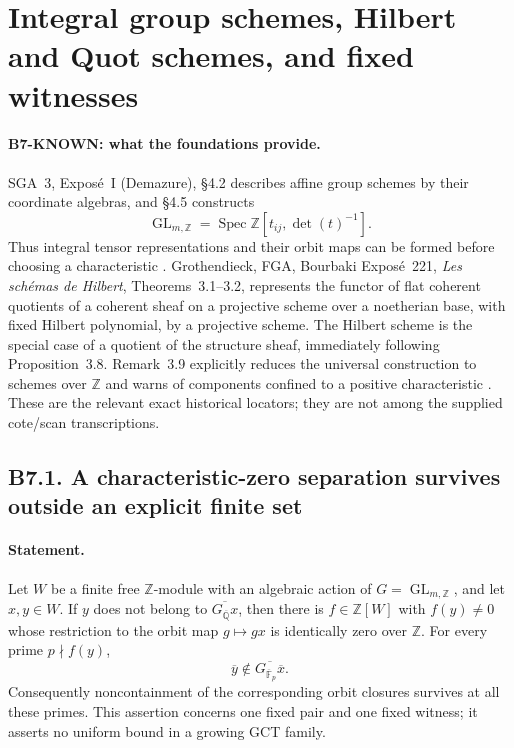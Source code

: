 \documentclass[11pt,a4paper]{article}
\begin{document}
\section{Integral group schemes, Hilbert and Quot schemes, and fixed witnesses}
\label{sec:bridge-integral}

\paragraph{B7-KNOWN: what the foundations provide.}
SGA~3, Expos\'e~I (Demazure), \S4.2 describes affine group schemes by
their coordinate algebras, and \S4.5 constructs
\[
 \operatorname{GL}_{m,\mathbb Z}
 =\operatorname{Spec}\mathbb Z[t_{ij},\det(t)^{-1}].
\]
Thus integral tensor representations and their orbit maps can be
formed before choosing a characteristic \cite{sga3-I}.
Grothendieck, FGA, Bourbaki Expos\'e~221,
\emph{Les sch\'emas de Hilbert}, Theorems~3.1--3.2, represents the
functor of flat coherent quotients of a coherent sheaf on a projective
scheme over a noetherian base, with fixed Hilbert polynomial, by a
projective scheme.  The Hilbert scheme is the special case of a
quotient of the structure sheaf, immediately following Proposition~3.8.
Remark~3.9 explicitly reduces the universal construction to schemes
over $\mathbb Z$ and warns of components confined to a positive
characteristic \cite{fga221}.  These are the relevant exact historical
locators; they are not among the supplied cote/scan transcriptions.

\subsection*{B7.1. A characteristic-zero separation survives outside an explicit finite set}
\paragraph{Statement.}
Let $W$ be a finite free $\mathbb Z$-module with an algebraic action of
$G=\operatorname{GL}_{m,\mathbb Z}$, and let $x,y\in W$.
If $y$ does not belong to $\overline{G_{\overline{\mathbb Q}}x}$,
then there is $f\in\mathbb Z[W]$ with $f(y)\neq0$ whose restriction
to the orbit map $g\mapsto gx$ is identically zero over $\mathbb Z$.
For every prime $p\nmid f(y)$,
\[
 \overline y\notin
 \overline{G_{\overline{\mathbb F}_p}\overline x}.
\]
Consequently noncontainment of the corresponding orbit closures
survives at all these primes.  This assertion concerns one fixed pair
and one fixed witness; it asserts no uniform bound in a growing GCT
family.
\end{document}
